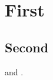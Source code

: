 \documentclass{article}
\begin{document}
\section{First}\label{sec:a}
\subsection{Second}\label{sec:b}
 and .
\end{document}
